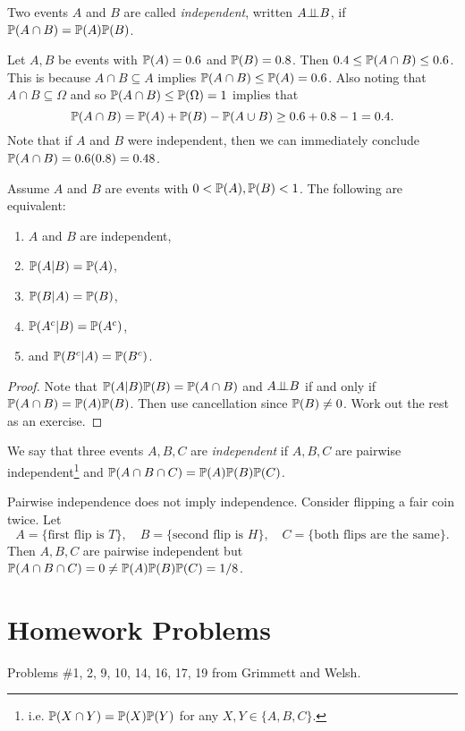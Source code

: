 \begin{definition}
  Two events $A$ and $B$ are called
  \emph{independent}, written
  $A {\perp\!\!\!\perp} B$, if
  $\mathbb{P}(A \cap B) = \mathbb{P}(A) \mathbb{P}(B)$.
\end{definition}

\begin{example}
  Let $A, B$ be events with
  $\mathbb{P}(A) = 0.6$ and $\mathbb{P}(B) = 0.8$. Then
  $0.4 \le \mathbb{P}(A \cap B) \le 0.6$.
  This is because $A \cap B \subseteq A$ implies
  $\mathbb{P}(A \cap B) \le \mathbb{P}(A) = 0.6$. Also noting
  that $A \cap B \subseteq \Omega$ and so
  $\mathbb{P}(A \cap B) \le \mathbb{P}(\Omega) = 1$ implies that
  \[
    \mathbb{P}(A \cap B) = \mathbb{P}(A) + \mathbb{P}(B) - \mathbb{P}(A \cup B)
    \ge 0.6 + 0.8 - 1 = 0.4.
  \]
  Note that if $A$ and $B$ were independent,
  then we can immediately conclude
  $\mathbb{P}(A \cap B) = 0.6(0.8) = 0.48$.
\end{example}

\begin{prop}
  Assume $A$ and $B$ are events with
  $0 < \mathbb{P}(A), \mathbb{P}(B) < 1$.
  The following are equivalent:
  \begin{enumerate}
    \item $A$ and $B$ are independent,
    \item $\mathbb{P}(A | B) = \mathbb{P}(A)$,
    \item $\mathbb{P}(B | A) = \mathbb{P}(B)$,
    \item $\mathbb{P}(A^c | B) = \mathbb{P}(A^c)$,
    \item and $\mathbb{P}(B^c | A) = \mathbb{P}(B^c)$.
  \end{enumerate}
\end{prop}

\begin{proof}
  Note that $\mathbb{P}(A | B) \mathbb{P}(B) = \mathbb{P}(A \cap B)$
  and $A {\perp\!\!\!\perp} B$ if and only if
  $\mathbb{P}(A \cap B) = \mathbb{P}(A) \mathbb{P}(B)$. Then
  use cancellation since $\mathbb{P}(B) \ne 0$. Work
  out the rest as an exercise.
\end{proof}

\begin{definition}
  We say that three events $A, B, C$ are
  \emph{independent} if $A, B, C$ are pairwise
  independent\footnote{i.e. $\mathbb{P}(X \cap Y) = \mathbb{P}(X)\mathbb{P}(Y)$ for any $X, Y \in \{A, B, C\}$.}
  and
  $\mathbb{P}(A \cap B \cap C) = \mathbb{P}(A) \mathbb{P}(B) \mathbb{P}(C)$.
\end{definition}

\begin{remark}
  Pairwise independence does not imply
  independence. Consider flipping a fair coin
  twice. Let
  \[
    A = \{\text{first flip is } T\}, \quad
    B = \{\text{second flip is } H\}, \quad
    C = \{\text{both flips are the same}\}.
  \]
  Then $A, B, C$ are pairwise independent but
  $\mathbb{P}(A \cap B \cap C) = 0 \ne \mathbb{P}(A) \mathbb{P}(B) \mathbb{P}(C) = 1 / 8$.
\end{remark}

\section{Homework Problems}

Problems \#1, 2, 9, 10, 14, 16, 17, 19 from Grimmett and Welsh.
